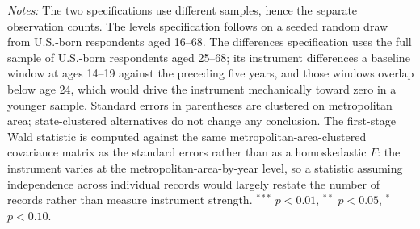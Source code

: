\begin{table}[!htbp]
\centering
\caption{IV Estimates of Immigrant Inflows on U.S.-Born Internal Migration}
\label{tab:migration_iv}
\begin{minipage}{\textwidth}
\footnotesize
\vspace{4pt}
\textit{Notes:} The two specifications use different samples, hence the separate observation counts. The levels specification follows \citet{card2001immigrant} on a seeded random draw from U.S.-born respondents aged 16--68. The differences specification uses the full sample of U.S.-born respondents aged 25--68; its instrument differences a baseline window at ages 14--19 against the preceding five years, and those windows overlap below age 24, which would drive the instrument mechanically toward zero in a younger sample. Standard errors in parentheses are clustered on metropolitan area; state-clustered alternatives do not change any conclusion. The first-stage Wald statistic is computed against the same metropolitan-area-clustered covariance matrix as the standard errors rather than as a homoskedastic $F$: the instrument varies at the metropolitan-area-by-year level, so a statistic assuming independence across individual records would largely restate the number of records rather than measure instrument strength. $^{***}$ $p<0.01$, $^{**}$ $p<0.05$, $^{*}$ $p<0.10$.
\end{minipage}
\end{table}

